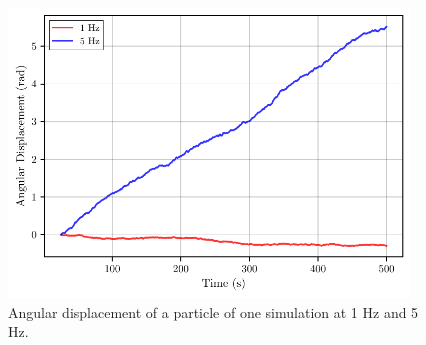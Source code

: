 \begin{figure}
  \begin{center}
    \includegraphics[width=0.95\textwidth]{figures/particle_displacement.pdf}
  \end{center}
  \caption[Angular displacement of a particle.]{Angular displacement of a particle of one simulation at 1 Hz and 5 Hz.}\label{fig:particleangulardisplacement}
\end{figure}

